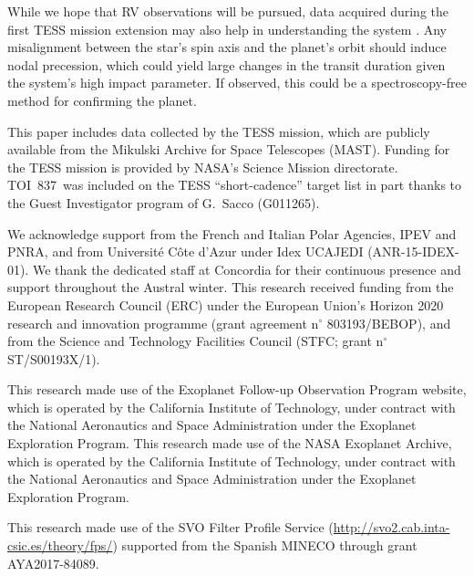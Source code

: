 \documentclass[12pt,twocolumn,tighten]{aastex63}
\newcommand{\tn}{TOI~837} %
\begin{document}
While we hope that RV observations will be pursued, data acquired
during the first TESS mission extension may also help in
understanding the system
\citep{bouma_extend_2017,huang_expected_2018}.  Any misalignment
between the star's spin axis and the planet's orbit should induce
nodal precession, which could yield large changes in the transit
duration given the system's high impact parameter.
If observed, this could be a spectroscopy-free method for 
confirming the planet.





\acknowledgements

This paper includes data collected by the TESS mission, which are
publicly available from the Mikulski Archive for Space Telescopes
(MAST).
%
Funding for the TESS mission is provided by NASA's Science Mission
directorate.
\tn\ was included on the TESS ``short-cadence'' target list in part
thanks to the Guest Investigator program of G.\ Sacco (G011265).
%

We acknowledge support from the French and Italian Polar Agencies, IPEV and PNRA, and from Universit\'e C\^ote d’Azur under Idex UCAJEDI (ANR-15-IDEX-01). We thank the dedicated staff at Concordia for their continuous presence and support throughout the Austral winter.
%
This research received funding from the European Research Council (ERC) under the European Union's Horizon 2020 research and innovation programme (grant agreement n$^\circ$ 803193/BEBOP), and from the Science and Technology Facilities Council (STFC; grant n$^\circ$ ST/S00193X/1).
%
%

This research made use of the Exoplanet Follow-up Observation
Program website, which is operated by the California Institute of
Technology, under contract with the National Aeronautics and Space
Administration under the Exoplanet Exploration Program.
%
This research made use of the NASA Exoplanet Archive, which is
operated by the California Institute of Technology, under contract
with the National Aeronautics and Space Administration under the
Exoplanet Exploration Program.
%

This research made use of the SVO Filter Profile Service
(\url{http://svo2.cab.inta-csic.es/theory/fps/}) supported from the Spanish
MINECO through grant AYA2017-84089.
\end{document}
